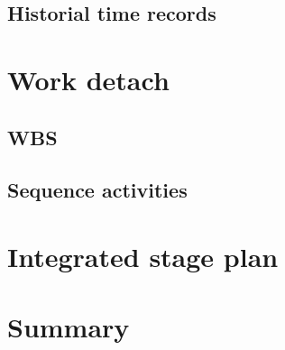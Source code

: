 \documentclass[twocolumn]{article}
\begin{document}
\subsection{Historial time records}

\section{Work detach}
\subsection{WBS}
\subsection{Sequence activities}
\section{Integrated stage plan}

\section{Summary}


\end{document}
